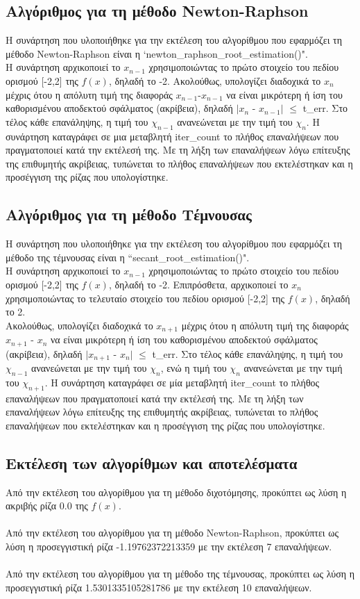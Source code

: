 \documentclass[a4paper,11pt]{article}
\newcommand{\lt}{\latintext}
\begin{document}
\subsection*{Αλγόριθμος για τη μέθοδο {\lt Newton-Raphson }}
Η συνάρτηση που υλοποιήθηκε για την εκτέλεση του αλγορίθμου που εφαρμόζει τη μέθοδο {\lt Newton-Raphson } είναι η {\lt `newton\_raphson\_root\_estimation()"}.\\
Η συνάρτηση αρχικοποιεί το {$x_{n-1}$} χρησιμοποιώντας το πρώτο στοιχείο του πεδίου ορισμού [-2,2] της {\lt $f(x)$}, δηλαδή το -2. Ακολούθως, υπολογίζει διαδοχικά το  {$x_{n}$} μέχρις ότου
η απόλυτη τιμή της διαφοράς {$x_{n-1}$}-{$x_{n-1}$} να είναι μικρότερη ή ίση του καθορισμένου αποδεκτού σφάλματος (ακρίβεια), δηλαδή $|${$x_{n}$} - {$x_{n-1}$}$|$ {$\leq$} {\lt t\_err}. Στο τέλος κάθε επανάληψης, η τιμή 		του {$χ_{n-1}$} ανανεώνεται με την τιμή του {$χ_{n}$}. Η συνάρτηση καταγράφει σε μια μεταβλητή {\lt iter\_count} το πλήθος επαναλήψεων που πραγματοποιεί κατά την εκτέλεσή της. Με τη λήξη των 							επαναλήψεων λόγω επίτευξης της επιθυμητής ακρίβειας, τυπώνεται το πλήθος επαναλήψεων που εκτελέστηκαν και η προσέγγιση της ρίζας που υπολογίστηκε.
\subsection*{Αλγόριθμος για τη μέθοδο Τέμνουσας}
Η συνάρτηση που υλοποιήθηκε για την εκτέλεση του αλγορίθμου που εφαρμόζει τη μέθοδο της τέμνουσας είναι η {\lt ``secant\_root\_estimation()"}. \\
Η συνάρτηση αρχικοποιεί το {$x_{n-1}$} χρησιμοποιώντας το πρώτο στοιχείο του πεδίου ορισμού [-2,2] της {\lt $f(x)$}, δηλαδή το -2. Επιπρόσθετα, αρχικοποιεί το {$x_{n}$} χρησιμοποιώντας το τελευταίο στοιχείο του 				πεδίου ορισμού [-2,2] της {\lt $f(x)$}, δηλαδή το 2.\\
Ακολούθως, υπολογίζει διαδοχικά το {$x_{n+1}$} μέχρις ότου η απόλυτη τιμή της διαφοράς {$x_{n+1}$} - {$x_{n}$} να είναι μικρότερη ή ίση του καθορισμένου αποδεκτού σφάλματος (ακρίβεια), δηλαδή 
$|${$x_{n+1}$} - {$x_{n}$}$|$ {$\leq$} {\lt t\_err}.  Στο τέλος κάθε επανάληψης, η τιμή του {$χ_{n-1}$} ανανεώνεται με την τιμή του {$χ_{n}$}, ενώ η τιμή του {$χ_{n}$} ανανεώνεται με την τιμή του {$χ_{n+1}$}. Η συνάρτηση 			καταγράφει σε μία μεταβλητή {\lt iter\_count} το πλήθος επαναλήψεων που πραγματοποιεί κατά την εκτέλεσή της. Με τη λήξη των επαναλήψεων λόγω επίτευξης της επιθυμητής ακρίβειας, τυπώνεται το πλήθος 			επαναλήψεων που εκτελέστηκαν και η προσέγγιση της ρίζας που υπολογίστηκε. 
\subsection*{Εκτέλεση των αλγορίθμων και αποτελέσματα}
Από την εκτέλεση του αλγορίθμου για τη μέθοδο διχοτόμησης, προκύπτει ως λύση η ακριβής ρίζα 0.0 της {$f(x)$}.\\
\\Από την εκτέλεση του αλγορίθμου για τη μέθοδο {\lt Newton-Raphson}, προκύπτει ως λύση η προσεγγιστική ρίζα -1.19762372213359 με την εκτέλεση 7 επαναλήψεων.\\
\\Από την εκτέλεση του αλγορίθμου για τη μέθοδο της τέμνουσας, προκύπτει ως λύση η προσεγγιστική ρίζα 1.5301335105281786 με την εκτέλεση 10 επαναλήψεων.
\end{document}
